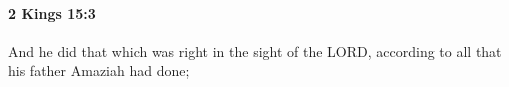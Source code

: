 
		\paragraph{2 Kings 15:3} %
			\label{2KINGS-15-3}

			And he did that which was right in the sight of the LORD, according to all that his father Amaziah had done;


